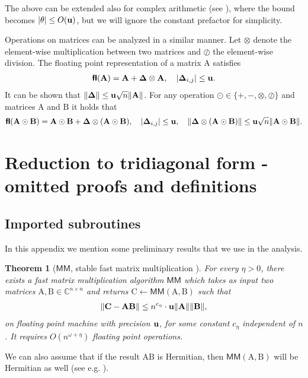 \documentclass{article}
\newtheorem{theorem}{Theorem}[section]
\newcommand\matA{\boldsymbol{\mathrm{A}}}
\newcommand\matB{\boldsymbol{\mathrm{B}}}
\newcommand\matC{\boldsymbol{\mathrm{C}}}
\newcommand\matDelta{\boldsymbol{\mathrm{\Delta}}}
\newcommand{\fl}{\boldsymbol{\mathsf{fl}}}
\newcommand{\umach}{\textbf{\textup{u}}}
\newcommand{\MM}{\mathsf{MM}}
\begin{document}
The above can be extended also for complex arithmetic (see \cite[Lemma 3.5]{higham2002accuracy}), where the bound becomes $|\theta|\leq O(\umach)$, but we will ignore the constant prefactor for simplicity. 

Operations on matrices can be analyzed in a similar manner. Let $\otimes$ denote the element-wise multiplication between two matrices and $\oslash$ the element-wise division. The floating point representation of a matrix $\matA$ satisfies
\begin{align*}
    \fl(\matA) = \matA+\matDelta \otimes \matA,\quad |\matDelta_{i,j}|\leq \umach.
\end{align*}
It can be shown that $\|\matDelta\|\leq \umach\sqrt{n}\|\matA\|$. 
For any operation $\odot\in\{+,-,\otimes,\oslash\}$ and matrices $\matA$ and $\matB$ it holds that
\begin{align}
    \label{eq:matrix_flop_errors}
    \fl(\matA\odot \matB) = \matA \odot \matB +\matDelta\otimes(\matA \odot \matB), 
    \quad 
    |\matDelta_{i,j}|\leq \umach, 
    \quad 
    \|\matDelta\otimes(\matA \odot \matB)\|\leq \umach\sqrt{n}\|\matA\odot\matB\|.
\end{align}




\section{Reduction to tridiagonal form - omitted proofs and definitions}
\label{appendix:tridiagonal_reduction}

\subsection{Imported subroutines}
\label{appendix:tridiagonal_reduction_subroutines}
In this appendix we mention some preliminary results that we use in the analysis.
\begin{theorem}[$ \MM$, stable fast matrix multiplication \cite{demmel2007fastmm,demmel2007fastla}]
\label{theorem:fast_mm}
For every $\eta>0$, there exists a fast matrix multiplication algorithm $ \MM$ which takes as input two matrices $\matA,\matB\in\mathbb{C}^{n\times n}$ and returns $\matC\leftarrow  \MM(\matA,\matB)$ such that
\begin{align*}
    \|\matC-\matA\matB\| \leq n^{c_{\eta}}\cdot\umach\|\matA\|\|\matB\|,
\end{align*}
on floating point machine with precision $\umach$, for some constant $c_{\eta}$ independent of $n$. It requires $O(n^{\omega+\eta})$ floating point operations.
\end{theorem}
We can also assume that if the result $\matA\matB$ is Hermitian, then $\MM(\matA,\matB)$ will be Hermitian as well (see e.g. \cite{sobczyk2024invariant}).
\end{document}
